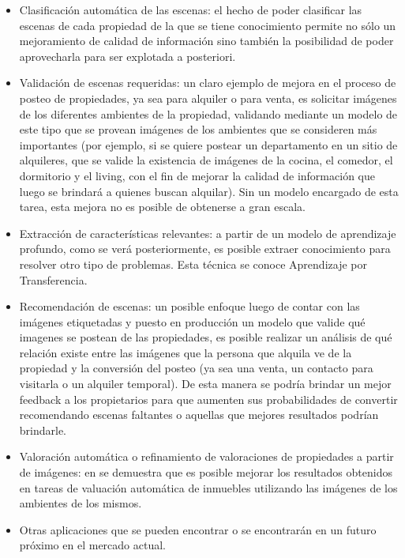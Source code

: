 \begin{itemize}
	\item Clasificación automática de las escenas: el hecho de poder clasificar las escenas de cada propiedad de la que se tiene conocimiento permite no sólo un mejoramiento de calidad de información sino también la posibilidad de poder aprovecharla para ser explotada a posteriori.
	\item Validación de escenas requeridas: un claro ejemplo de mejora en el proceso de posteo de propiedades, ya sea para alquiler o para venta, es solicitar imágenes de los diferentes ambientes de la propiedad, validando mediante un modelo de este tipo que se provean imágenes de los ambientes que se consideren más importantes (por ejemplo, si se quiere postear un departamento en un sitio de alquileres, que se valide la existencia de imágenes de la cocina, el comedor, el dormitorio y el living, con el fin de mejorar la calidad de información que luego se brindará a quienes buscan alquilar). Sin un modelo encargado de esta tarea, esta mejora no es posible de obtenerse a gran escala.
	\item Extracción de características relevantes: a partir de un modelo de aprendizaje profundo, como se verá posteriormente, es posible extraer conocimiento para resolver otro tipo de problemas. Esta técnica se conoce Aprendizaje por Transferencia. 
	\item Recomendación de escenas: un posible enfoque luego de contar con las imágenes etiquetadas y puesto en producción un modelo que valide qué imagenes se postean de las propiedades, es posible realizar un análisis de qué relación existe entre las imágenes que la persona que alquila ve de la propiedad y la conversión del posteo (ya sea una venta, un contacto para visitarla o un alquiler temporal). De esta manera se podría brindar un mejor feedback a los propietarios para que aumenten sus probabilidades de convertir recomendando escenas faltantes o aquellas que mejores resultados podrían brindarle.
	\item Valoración automática o refinamiento de valoraciones de propiedades a partir de imágenes: en \cite{vision_based_real_estate_price_estimation} se demuestra que es posible mejorar los resultados obtenidos en tareas de valuación automática de inmuebles utilizando las imágenes de los ambientes de los mismos. 
	\item Otras aplicaciones que se pueden encontrar o se encontrarán en un futuro próximo en el mercado actual.
\end{itemize}


